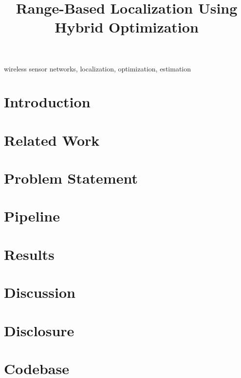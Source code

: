 \documentclass[conference]{IEEEtran}
\begin{document}
\title{Range-Based Localization Using Hybrid Optimization}

\author{
}

\maketitle

\begin{abstract}


\end{abstract}

\begin{IEEEkeywords}
wireless sensor networks, localization, optimization, estimation
\end{IEEEkeywords}

\section{Introduction}
\label{sec:intro}


\section{Related Work}
\label{sec:related-work}


\section{Problem Statement}
\label{sec:prob-statement}



\section{Pipeline}
\label{sec:pipeline}


\section{Results}



\section{Discussion}



\section{Disclosure}



\section{Codebase}



\printbibliography
\end{document}
